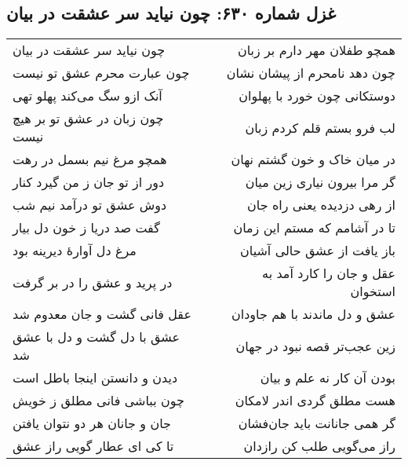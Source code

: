 \begin{center}
\section*{غزل شماره ۶۳۰: چون نیاید سر عشقت در بیان}
\label{sec:630}
\begin{longtable}{l p{0.5cm} r}
چون نیاید سر عشقت در بیان
&&
همچو طفلان مهر دارم بر زبان
\\
چون عبارت محرم عشق تو نیست
&&
چون دهد نامحرم از پیشان نشان
\\
آنک ازو سگ می‌کند پهلو تهی
&&
دوستکانی چون خورد با پهلوان
\\
چون زبان در عشق تو بر هیچ نیست
&&
لب فرو بستم قلم کردم زبان
\\
همچو مرغ نیم بسمل در رهت
&&
در میان خاک و خون گشتم نهان
\\
دور از تو جان ز من گیرد کنار
&&
گر مرا بیرون نیاری زین میان
\\
دوش عشق تو درآمد نیم شب
&&
از رهی دزدیده یعنی راه جان
\\
گفت صد دریا ز خون دل بیار
&&
تا در آشامم که مستم این زمان
\\
مرغ دل آوارهٔ دیرینه بود
&&
باز یافت از عشق حالی آشیان
\\
در پرید و عشق را در بر گرفت
&&
عقل و جان را کارد آمد به استخوان
\\
عقل فانی گشت و جان معدوم شد
&&
عشق و دل ماندند با هم جاودان
\\
عشق با دل گشت و دل با عشق شد
&&
زین عجب‌تر قصه نبود در جهان
\\
دیدن و دانستن اینجا باطل است
&&
بودن آن کار نه علم و بیان
\\
چون بباشی فانی مطلق ز خویش
&&
هست مطلق گردی اندر لامکان
\\
جان و جانان هر دو نتوان یافتن
&&
گر همی جانانت باید جان‌فشان
\\
تا کی ای عطار گویی راز عشق
&&
راز می‌گویی طلب کن رازدان
\\
\end{longtable}
\end{center}
